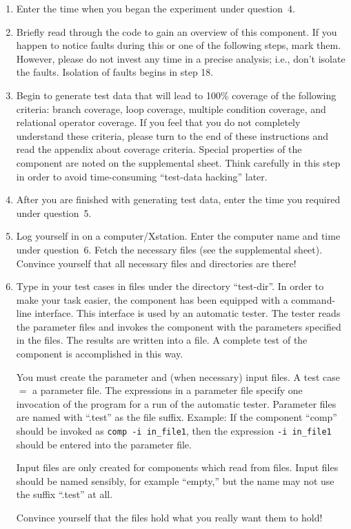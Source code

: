 \begin{enumerate}
\addtocounter{enumi}{1}

\item Enter the time when you began the experiment under question~4.

\item Briefly read through the code to gain an overview of this component.  
If you happen to notice faults during this or one of the following
steps, mark them.  However, please do not invest any time in a precise
analysis; i.e., don't isolate the faults.  Isolation of faults begins
in step 18. 

\item Begin to generate test data that will lead to 100\% coverage of
the following criteria:  branch coverage, loop coverage,
multiple condition coverage, and relational operator coverage.  
If you feel that you do not completely understand these criteria,
please turn to the end of these instructions and read the appendix
about coverage criteria.
Special properties of the component are noted on the supplemental sheet.
Think carefully in this step in order to avoid time-consuming 
``test-data hacking'' later.

\item After you are finished with generating test data, enter the time
you required under question~5.

\item Log yourself in on a computer/Xstation.  Enter the computer name
and time under question~6.
Fetch the necessary files (see the supplemental sheet).
Convince yourself that all necessary files and directories are there!

\item Type in your test cases in files under the directory ``test-dir''.
In order to make your task easier, the component has been equipped
with a command-line interface.
This interface is used by an automatic tester.  The tester reads the
parameter files and invokes the component with the parameters
specified in the files.
The results are written into a file.
A complete test of the component is accomplished in this way.

You must create the parameter and (when necessary) input files.
A test case $=$ a parameter file.
The expressions in a parameter file specify one invocation of the
program for a run of the automatic tester.
Parameter files are named with ``.test'' as the file suffix.
Example: If the component ``comp'' should be invoked as \mbox{\tt comp -i
in\_file1}, then the expression \mbox{\tt -i in\_file1} should be entered
into the parameter file.

Input files are only created for components which read from files.
Input files should be named sensibly, for example ``empty,'' but the
name may not use the suffix ``.test'' at all.

Convince yourself that the files hold what you really want them to
hold!

\end{enumerate}


